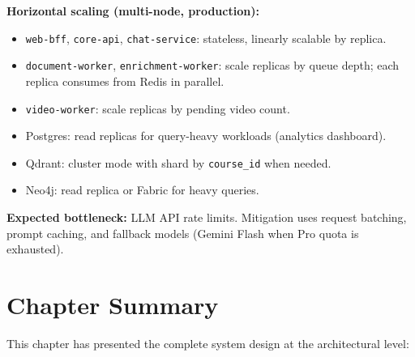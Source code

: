 \textbf{Horizontal scaling (multi-node, production):}
\begin{itemize}
    \item \texttt{web-bff}, \texttt{core-api}, \texttt{chat-service}:
          stateless, linearly scalable by replica.
    \item \texttt{document-worker}, \texttt{enrichment-worker}: scale
          replicas by queue depth; each replica consumes from Redis in
          parallel.
    \item \texttt{video-worker}: scale replicas by pending video count.
    \item Postgres: read replicas for query-heavy workloads (analytics
          dashboard).
    \item Qdrant: cluster mode with shard by \texttt{course\_id} when
          needed.
    \item Neo4j: read replica or Fabric for heavy queries.
\end{itemize}

\textbf{Expected bottleneck:} LLM API rate limits. Mitigation uses request
batching, prompt caching, and fallback models (Gemini Flash when Pro quota
is exhausted).

\section{Chapter Summary}

This chapter has presented the complete system design at the architectural
level:

